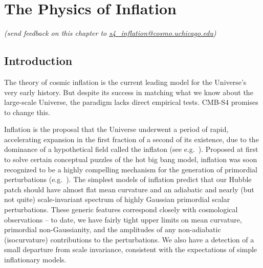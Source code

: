  
\chapter{The Physics of Inflation}


\begin{center}
{\small {\it (send feedback on this chapter to \href{mailto:s4\_inflation@cosmo.uchicago.edu}{s4\_inflation@cosmo.uchicago.edu})}}
\end{center}

\section{Introduction}

The theory of cosmic inflation is the current leading model for the Universe's
very early history.  But despite its success in matching what we know about the
large-scale Universe, the paradigm
lacks direct empirical tests.  CMB-S4 promises to change this.

Inflation is the proposal that the Universe underwent a period of rapid,
accelerating expansion in the first fraction of a second of its existence,
due to the dominance of a hypothetical field called the inflaton
(see e.g.\ \cite{EllisWands}).
Proposed at first to solve certain conceptual puzzles of the hot big bang
model, inflation was soon recognized to be a highly compelling mechanism for
the generation of primordial perturbations
(e.g.\ \cite{AbbottPi,Linde:2005ht,LemoineMartinPeter}).
The simplest models of inflation predict that our Hubble patch should have
almost flat mean curvature and an adiabatic and nearly (but not quite)
scale-invariant spectrum of highly Gaussian primordial scalar perturbations.
These generic features correspond closely with cosmological observations --
to date, we have fairly tight upper limits on mean curvature, primordial
non-Gaussianity, and the amplitudes of any non-adiabatic (isocurvature)
contributions to the perturbations. We also have a detection of a small
departure from scale invariance, consistent with the expectations of simple
inflationary models.


